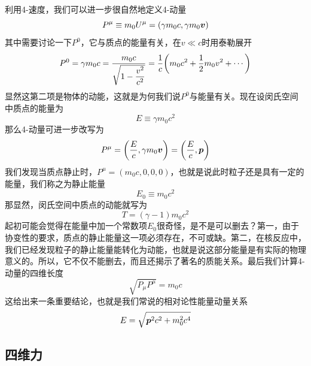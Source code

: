 \documentclass[12pt, a4paper, oneside]{ctexbook}
\begin{document}
利用4-速度，我们可以进一步很自然地定义4-动量
\begin{equation}
	P^{\mu}\equiv m_{0}U^{\mu}=(\gamma m_{0}c,\gamma m_{0}\vb*{v})
\end{equation}
其中需要讨论一下$P^{0}$，它与质点的能量有关，在$v\ll c$时用泰勒展开
\begin{equation}
	P^{0}=\gamma m_{0}c=\dfrac{m_{0}c}{\sqrt{1-\dfrac{v^{2}}{c^{2}}}}=\dfrac{1}{c}\qty(m_{0}c^{2}+\dfrac{1}{2}m_{0}v^{2}+\cdots)
\end{equation}
显然这第二项是物体的动能，这就是为何我们说$P^{0}$与能量有关。现在设闵氏空间中质点的能量为
\begin{equation}
	E\equiv\gamma m_{0}c^{2}
\end{equation}
那么4-动量可进一步改写为
\begin{equation}
	P^{\mu}=\qty(\dfrac{E}{c},\gamma m_{0}\vb*{v})=\qty(\dfrac{E}{c},\vb*{p})
\end{equation}
我们发现当质点静止时，$P^{\mu}=(m_{0}c,0,0,0)$，也就是说此时粒子还是具有一定的能量，我们称之为静止能量
\begin{equation}
	E_{0}\equiv m_{0}c^{2}
\end{equation}
那显然，闵氏空间中质点的动能就写为
\begin{equation}
	T=(\gamma-1)m_{0}c^{2}
\end{equation}
起初可能会觉得在能量中加一个常数项$E_{0}$很奇怪，是不是可以删去？第一，由于协变性的要求，质点的静止能量这一项必须存在，不可或缺。第二，在核反应中，我们已经发现粒子的静止能量能转化为动能，也就是说这部分能量是有实际的物理意义的。所以，它不仅不能删去，而且还揭示了著名的质能关系。最后我们计算4-动量的四维长度
\begin{equation}
	\sqrt{P_{\mu}P^{\mu}}=m_{0}c
\end{equation}
这给出来一条重要结论，也就是我们常说的相对论性能量动量关系
\begin{equation}
	E=\sqrt{\vb*{p}^{2}c^{2}+m_{0}^{2}c^{4}}
\end{equation}

\subsection{四维力}
\end{document}
